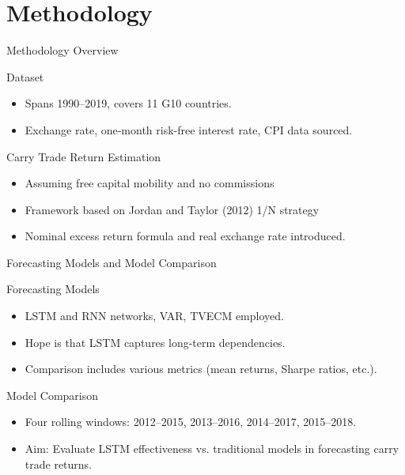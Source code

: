 \documentclass{beamer}
\begin{document}
\section{Methodology}

\begin{frame}{Methodology Overview}
    \begin{block}{Dataset}
        \begin{itemize}
            \item Spans 1990–2019, covers 11 G10 countries.
            \item Exchange rate, one-month risk-free interest rate, CPI data sourced.
        \end{itemize}
    \end{block}

    \begin{block}{Carry Trade Return Estimation}
        \begin{itemize}
            \item Assuming free capital mobility and no commissions
            \item Framework based on Jordan and Taylor (2012) 1/N strategy
            \item Nominal excess return formula and real exchange rate introduced.
        \end{itemize}
    \end{block}
\end{frame}

\begin{frame}{Forecasting Models and Model Comparison}
    \begin{block}{Forecasting Models}
        \begin{itemize}
            \item LSTM and RNN networks, VAR, TVECM employed.
            \item Hope is that LSTM captures long-term dependencies.
            \item Comparison includes various metrics (mean returns, Sharpe ratios, etc.).
        \end{itemize}
    \end{block}

    \begin{block}{Model Comparison}
        \begin{itemize}
            \item Four rolling windows: 2012–2015, 2013–2016, 2014–2017, 2015–2018.
            \item Aim: Evaluate LSTM effectiveness vs. traditional models in forecasting carry trade returns.
        \end{itemize}
    \end{block}
\end{frame}
\end{document}
